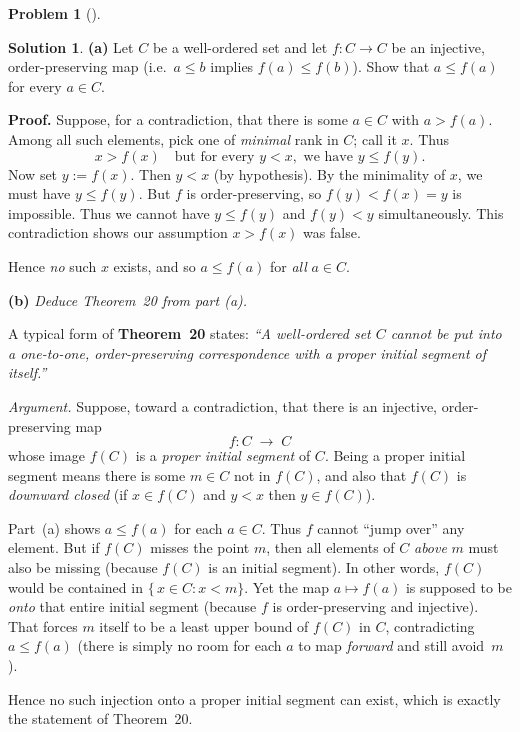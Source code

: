 \documentclass[12pt]{article}
\theoremstyle{definition} %
\newtheorem{solution}{Solution}
\newtheorem{problem}{Problem}
\theoremstyle{plain} %
\begin{document}
\begin{problem}[]
    
\end{problem}
\begin{solution}
    \textbf{(a)} Let $C$ be a well-ordered set and let $f\colon C\to C$ be an injective, 
    order-preserving map (i.e.\ $a \le b$ implies $f(a)\le f(b)$).  
    Show that $a \le f(a)$ for every $a\in C$.  
    
    \smallskip
    
    \textbf{Proof.}
    Suppose, for a contradiction, that there is some $a\in C$ with $a > f(a).$  
    Among all such elements, pick one of \emph{minimal} rank in $C$; call it $x$.  
    Thus 
    \[
    x > f(x)\quad\text{but for every }y<x,\text{ we have }y \le f(y).
    \]
    Now set $y := f(x)$.  Then $y < x$ (by hypothesis).  
    By the minimality of $x$, we must have $y \le f(y)$.  
    But $f$ is order-preserving, so $f(y) < f(x)=y$ is impossible.  
    Thus we cannot have $y \le f(y)$ and $f(y)<y$ simultaneously.  
    This contradiction shows our assumption $x>f(x)$ was false.
    
    Hence \emph{no} such $x$ exists, and so $a \le f(a)$ for \emph{all} $a\in C.$
    
    \bigskip
    
    \noindent
    \textbf{(b)} \emph{Deduce Theorem~20 from part (a).}
    
    \smallskip
    
    A typical form of \textbf{Theorem~20} states:  
    \emph{``A well-ordered set $C$ cannot be put into a one-to-one, 
    order-preserving correspondence with a \emph{proper} initial segment of itself.''}
    
    \smallskip
    
    \noindent
    \emph{Argument.}  
    Suppose, toward a contradiction, 
    that there is an injective, order-preserving map 
    \[
    f\colon C\;\longrightarrow\;C
    \]
    whose image $f(C)$ is a \emph{proper initial segment} of $C$.  
    Being a proper initial segment means there is some $m\in C$ not in $f(C)$, 
    and also that $f(C)$ is \emph{downward closed} (if $x\in f(C)$ and $y<x$ then $y\in f(C)$).  
    
    Part~(a) shows $a \le f(a)$ for each $a\in C$.  
    Thus $f$ cannot ``jump over'' any element.  
    But if $f(C)$ misses the point $m$, then all elements of $C$ \emph{above} $m$ 
    must also be missing (because $f(C)$ is an initial segment).  
    In other words, $f(C)$ would be contained in $\{\,x\in C:x<m\}.$  
    Yet the map $a\mapsto f(a)$ is supposed to be \emph{onto} that entire initial segment 
    (because $f$ is order-preserving and injective).  
    That forces $m$ itself to be a least upper bound of $f(C)$ in $C$, 
    contradicting $a \le f(a)$ (there is simply no room for each $a$ to map \emph{forward} 
    and still avoid~$m$).  
    
    Hence no such injection onto a proper initial segment can exist, 
    which is exactly the statement of Theorem~20.  
     
\end{solution}
\end{document}
